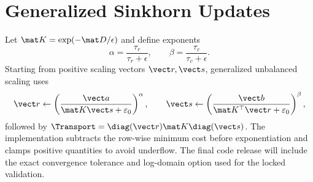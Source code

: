 \section{Generalized Sinkhorn Updates}\label{app:sinkhorn}
Let $\mat K=\exp(-\mat D/\epsilon)$ and define exponents
\begin{equation}
\alpha=\frac{\tau_r}{\tau_r+\epsilon},\qquad
\beta=\frac{\tau_c}{\tau_c+\epsilon}.
\end{equation}
Starting from positive scaling vectors $\vect r,\vect s$, generalized unbalanced scaling uses
\begin{equation}
\vect r\leftarrow\left(\frac{\vect a}{\mat K\vect s+\varepsilon_0}\right)^{\alpha},
\qquad
\vect s\leftarrow\left(\frac{\vect b}{\mat K^\top\vect r+\varepsilon_0}\right)^{\beta},
\end{equation}
followed by $\Transport=\diag(\vect r)\mat K\diag(\vect s)$. The implementation subtracts the row-wise minimum cost before exponentiation and clamps positive quantities to avoid underflow. The final code release will include the exact convergence tolerance and log-domain option used for the locked validation.
